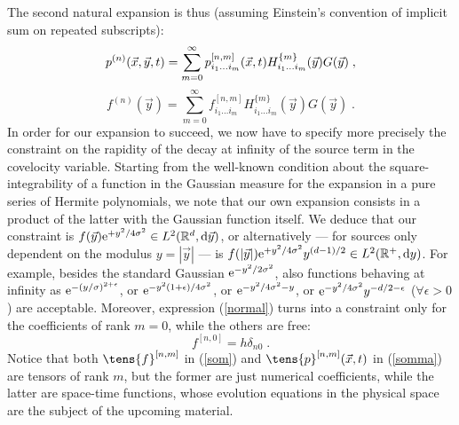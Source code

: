 The second natural expansion is thus (assuming Einstein's convention of implicit sum on repeated subscripts):
\begin{equation} \label{somma}
 p^{(n)}(\vec{x},\vec{y},t)=\sum_{m=0}^{\infty}p^{[n,m]}_{i_1\ldots i_m}(\vec{x},t)H^{\{m\}}_{i_1\ldots i_m}(\vec{y})G(\vec{y})\;,
\end{equation}
\begin{equation} \label{som}
 f^{(n)}(\vec{y})=\sum_{m=0}^{\infty}f^{[n,m]}_{i_1\ldots i_m}H^{\{m\}}_{i_1\ldots i_m}(\vec{y})G(\vec{y})\;.
\end{equation}
In order for our expansion to succeed, we now have to specify more precisely the constraint on the rapidity of the decay at infinity of the source term
in the covelocity variable. Starting from the well-known condition about the square-integrability of a function in the Gaussian measure for the
expansion in a pure series of Hermite polynomials, we note that our own expansion consists in a product of the latter with the Gaussian function itself.
We deduce that our constraint is $f(\vec{y})\mathrm{e}^{+y^2/4\sigma^2}\in L^2(\mathbb{R}^d,\mathrm{d}\vec{y})$, or alternatively
--- for sources only dependent on the modulus $y=|\vec{y}|$ --- is $f(|\vec{y}|)\mathrm{e}^{+y^2/4\sigma^2}y^{(d-1)/2}\in L^2(\mathbb{R}^+,\mathrm{d} y)$.
For example, besides the standard Gaussian $\mathrm{e}^{-y^2/2\sigma^2}$, also functions behaving at infinity as $\mathrm{e}^{-(y/\sigma)^{2+\epsilon}}$,
or $\mathrm{e}^{-y^2(1+\epsilon)/4\sigma^2}$, or $\mathrm{e}^{-y^2/4\sigma^2-y}$, or $\mathrm{e}^{-y^2/4\sigma^2}y^{-d/2-\epsilon}$ ($\forall\epsilon>0$) are acceptable.
Moreover, expression (\ref{normal}) turns into a constraint only for the coefficients of rank $m=0$, while the others are free:
\begin{equation} \label{normaliz}
 f^{[n,0]}=h\delta_{n0}\;.
\end{equation}
Notice that both $\tens{f}^{[n,m]}$ in (\ref{som}) and $\tens{p}^{[n,m]}(\xt)$ in (\ref{somma}) are tensors of rank $m$, but the former are just numerical
coefficients, while the latter are space-time functions, whose evolution equations in the physical space are the subject of the upcoming material.

